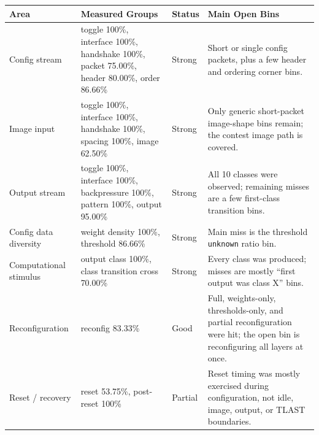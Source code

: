 \begin{strip}
  \centering
  \label{tab:coverage-summary}
  \small
  \renewcommand{\arraystretch}{1.18}
  \begin{tabular}{@{}p{}p{}p{}p{}@{}}
    \toprule
    \textbf{Area} & \textbf{Measured Groups} & \textbf{Status} & \textbf{Main Open Bins} \\
    \midrule
    Config stream &
    toggle 100\%, interface 100\%, handshake 100\%, packet 75.00\%, header 80.00\%, order 86.66\% &
    Strong &
    Short or single config packets, plus a few header and ordering corner bins. \\

    Image input &
    toggle 100\%, interface 100\%, handshake 100\%, spacing 100\%, image 62.50\% &
    Strong &
    Only generic short-packet image-shape bins remain; the contest image path is covered. \\

    Output stream &
    toggle 100\%, interface 100\%, backpressure 100\%, pattern 100\%, output 95.00\% &
    Strong &
    All 10 classes were observed; remaining misses are a few first-class transition bins. \\

    Config data diversity &
    weight density 100\%, threshold 86.66\% &
    Strong &
    Main miss is the threshold \texttt{unknown} ratio bin. \\

    Computational stimulus &
    output class 100\%, class transition cross 70.00\% &
    Strong &
    Every class was produced; misses are mostly ``first output was class X'' bins. \\

    Reconfiguration &
    reconfig 83.33\% &
    Good &
    Full, weights-only, thresholds-only, and partial reconfiguration were hit; the open bin is reconfiguring all layers at once. \\

    Reset / recovery &
    reset 53.75\%, post-reset 100\% &
    Partial &
    Reset timing was mostly exercised during configuration, not idle, image, output, or TLAST boundaries. \\
    \bottomrule
  \end{tabular}
  \renewcommand{\arraystretch}{1.0}
\end{strip}

